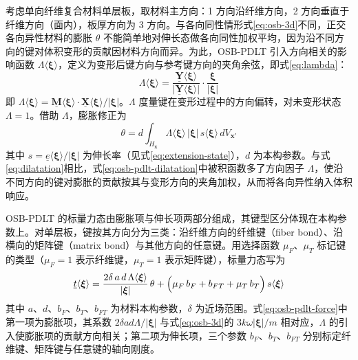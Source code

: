 考虑单向纤维复合材料单层板，取材料主方向：1 方向沿纤维方向，2 方向垂直于纤维方向（面内），板厚方向为 3 方向。与各向同性情形式\eqref{eq:osb-3d}不同，正交各向异性材料的膨胀 $\theta$ 不能简单地对伸长态做各向同性加权平均，因为沿不同方向的键对体积变形的贡献因材料方向而异。为此，OSB-PDLT 引入方向相关的影响函数 $\Lambda\langle\boldsymbol{\xi}\rangle$，定义为变形后键方向与参考键方向的夹角余弦，即式\eqref{eq:lambda}：
\begin{equation}
  \Lambda\langle\boldsymbol{\xi}\rangle=
  \frac{\underline{\mathbf{Y}}\langle\boldsymbol{\xi}\rangle}{\bigl|\underline{\mathbf{Y}}\langle\boldsymbol{\xi}\rangle\bigr|}\cdot
  \frac{\boldsymbol{\xi}}{|\boldsymbol{\xi}|}
  \label{eq:lambda}
\end{equation}
即 $\Lambda\langle\boldsymbol{\xi}\rangle=\underline{\mathbf{M}}\langle\boldsymbol{\xi}\rangle\cdot\underline{\mathbf{X}}\langle\boldsymbol{\xi}\rangle/|\boldsymbol{\xi}|$。$\Lambda$ 度量键在变形过程中的方向偏转，对未变形状态 $\Lambda=1$。借助 $\Lambda$，膨胀修正为
\begin{equation}
  \theta=d\int_{H_{\mathbf{x}}}\Lambda\langle\boldsymbol{\xi}\rangle\,|\boldsymbol{\xi}|\,s\langle\boldsymbol{\xi}\rangle\,dV_{\mathbf{x}'}
  \label{eq:osb-pdlt-dilatation}
\end{equation}
其中 $s=\underline{e}\langle\boldsymbol{\xi}\rangle/|\boldsymbol{\xi}|$ 为伸长率（见式\eqref{eq:extension-state}），$d$ 为本构参数。与式\eqref{eq:dilatation}相比，式\eqref{eq:osb-pdlt-dilatation}中被积函数多了方向因子 $\Lambda$，使沿不同方向的键对膨胀的贡献按其与变形方向的夹角加权，从而将各向异性纳入体积响应。

OSB-PDLT 的标量力态由膨胀项与伸长项两部分组成，其键型区分体现在本构参数上。对单层板，键按其方向分为三类：沿纤维方向的纤维键（fiber bond）、沿横向的矩阵键（matrix bond）与其他方向的任意键。用选择函数 $\mu_{F}$、$\mu_{T}$ 标记键的类型（$\mu_{F}=1$ 表示纤维键，$\mu_{T}=1$ 表示矩阵键），标量力态写为
\begin{equation}
  \underline{t}\langle\boldsymbol{\xi}\rangle=
  \frac{2\delta\,a\,d\,\Lambda\langle\boldsymbol{\xi}\rangle}{|\boldsymbol{\xi}|}\,\theta+
  \Bigl(\mu_{F}\,b_{F}+b_{FT}+\mu_{T}\,b_{T}\Bigr)\,s\langle\boldsymbol{\xi}\rangle
  \label{eq:osb-pdlt-force}
\end{equation}
其中 $a$、$d$、$b_{F}$、$b_{T}$、$b_{FT}$ 为材料本构参数，$\delta$ 为近场范围。式\eqref{eq:osb-pdlt-force}中第一项为膨胀项，其系数 $2\delta a d\Lambda/|\boldsymbol{\xi}|$ 与式\eqref{eq:osb-3d}的 $3k\omega|\boldsymbol{\xi}|/m$ 相对应，$\Lambda$ 的引入使膨胀项的贡献方向相关；第二项为伸长项，三个参数 $b_{F}$、$b_{T}$、$b_{FT}$ 分别标定纤维键、矩阵键与任意键的轴向刚度。

